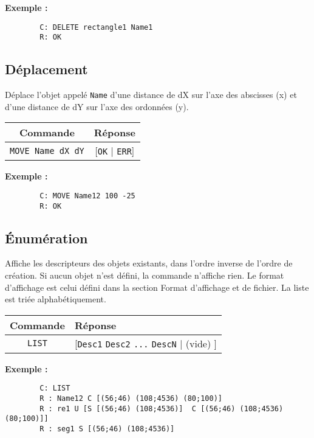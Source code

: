 \documentclass[11pt,a4paper]{article}
\begin{document}
	\textbf{Exemple :}
	\begin{verbatim}
		C: DELETE rectangle1 Name1
		R: OK
	\end{verbatim}
	
	\subsection{Déplacement}
	Déplace l'objet appelé \texttt{Name} d’une distance de dX sur l'axe des abscisses (x) et d’une distance de dY sur l'axe des ordonnées (y).
	
	\begin{center}
		\begin{tabular}[c]{|c | c|}
			\hline
			\textbf{Commande} & \textbf{Réponse} \\
			\hline
			\texttt{MOVE Name dX dY} & [\texttt{OK} | \texttt{ERR}] \\
			\hline
		\end{tabular}
	\end{center}
	
	\textbf{Exemple :}
	\begin{verbatim}
		C: MOVE Name12 100 -25
		R: OK
	\end{verbatim}
	
	\subsection{Énumération}
	Affiche les descripteurs des objets existants, dans l’ordre inverse de l’ordre de création. Si aucun objet n’est défini, la commande n’affiche rien. Le format d’affichage est celui défini dans la section Format d’affichage et de fichier. La liste est triée alphabétiquement.
	
	\begin{center}
		\begin{tabular}[c]{|c | p{3cm}|}
			\hline
			\textbf{Commande} & \textbf{Réponse} \\
			\hline
			\texttt{LIST} & [\texttt{Desc1} \newline \texttt{Desc2} \newline \texttt{...} \newline \texttt{DescN} | (vide) ] \\
			\hline
		\end{tabular}
	\end{center}

	\textbf{Exemple :}
	\begin{verbatim}
		C: LIST
		R : Name12 C [(56;46) (108;4536) (80;100)]
		R : re1 U [S [(56;46) (108;4536)]  C [(56;46) (108;4536) (80;100)]]
		R : seg1 S [(56;46) (108;4536)]
	\end{verbatim}
	
\end{document}
